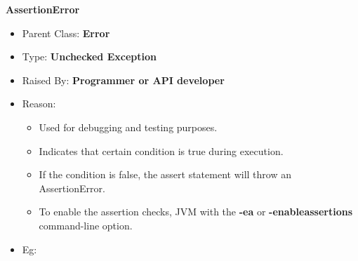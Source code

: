 \begin{flushleft}
	\newpage
	\textbf{AssertionError}
	\begin{itemize}
		\item Parent Class: \textbf{Error}
		\item Type: \textbf{Unchecked Exception}
		\item Raised By: \textbf{Programmer or API developer}
		\item Reason: 
		\begin{itemize}
			\item Used for debugging and testing purposes. 
			\item Indicates that certain condition is true during execution. 
			\item If the condition is false, the assert statement will throw an AssertionError.
			\item To enable the assertion checks, JVM with the \textbf{-ea} or \textbf{-enableassertions} command-line option.
		\end{itemize}

		\item Eg:
		\bigskip
		
	\end{itemize}
	
\end{flushleft}

